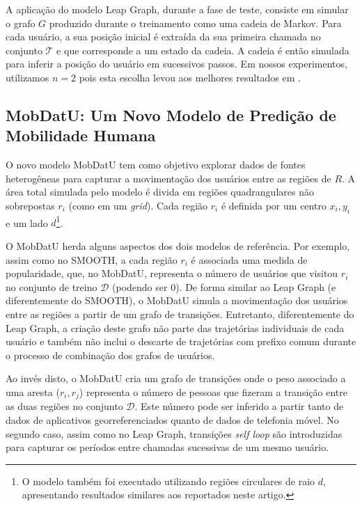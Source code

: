 \documentclass[10pt, a4paper, onecolumn, conference, compsocconf]{IEEEtran}
\begin{document}
A aplicação do modelo Leap Graph, durante a fase de teste, consiste em simular o grafo $G$ produzido durante o treinamento como uma cadeia de Markov. Para cada usuário, a sua posição inicial  é extraída da sua primeira chamada no conjunto $\mathcal{T}$ e que corresponde a um estado da cadeia.   A cadeia é então simulada para inferir a posição do usuário em sucessivos passos.  Em nossos experimentos, utilizamos $n=2$ pois esta escolha levou aos melhores resultados em \cite{Dong2013}. 



\subsection{MobDatU: Um Novo Modelo de Predição de Mobilidade Humana}\label{subsec:mobdatu}

O novo modelo MobDatU tem como objetivo explorar dados de fontes heterogêneas para capturar a movimentação dos usuários entre as regiões de $R$. A área total simulada pelo modelo é divida em regiões quadrangulares não sobrepostas $r_i$ (como em um {\it grid}). Cada região $r_i$ é definida por um centro $x_i,y_i$ e um  lado $d$\footnote{O  modelo também foi executado utilizando regiões circulares de raio $d$, apresentando resultados similares aos reportados neste artigo.}.

O MobDatU herda alguns aspectos dos dois modelos de referência. Por exemplo, assim como no SMOOTH, a cada região $r_i$ é associada uma  medida de popularidade, que, no MobDatU, representa o número de usuários que visitou  $r_{i}$ no conjunto de treino $\mathcal{D}$ (podendo ser 0).  
De forma similar ao Leap Graph (e diferentemente do SMOOTH), o MobDatU simula a movimentação dos usuários entre as regiões a partir de um grafo de transições. Entretanto, diferentemente do Leap Graph,  a criação deste grafo não parte das trajetórias individuais de cada usuário e também não inclui o descarte de trajetórias com prefixo comum durante o processo de combinação dos grafos de  usuários. 

Ao invés disto, o MobDatU cria um grafo de transições onde o peso associado a uma aresta ($r_i,r_j$) representa o número de pessoas que fizeram a transição entre as duas regiões no conjunto $\mathcal{D}$.  Este número pode ser inferido a partir tanto de dados de aplicativos georreferenciados quanto de dados de telefonia móvel. No segundo caso, assim como no Leap Graph, transições {\it self loop} são introduzidas para capturar os períodos entre chamadas sucessivas de um mesmo usuário. 
\end{document}

